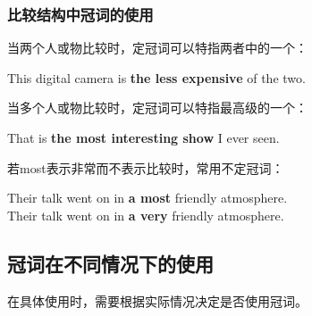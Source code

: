 \documentclass[UTF8]{ctexart}
\newcommand{\littf}[1]{{\hspace{3pt}\ttfamily #1}}
\begin{document}
\subsubsection{比较结构中冠词的使用}
    当两个人或物比较时，定冠词可以特指两者中的一个：
    \begin{center}
        \large\ttfamily
        This digital camera is \textbf{the less expensive} of the two.\\[4mm]
    \end{center}
    当多个人或物比较时，定冠词可以特指最高级的一个：
    \begin{center}
        \large\ttfamily
        That is \textbf{the most interesting show} I ever seen.\\[4mm]
    \end{center}
    若\littf{most}表示非常而不表示比较时，常用不定冠词：
    \begin{center}
        \large\ttfamily
        Their talk went on in \textbf{a most} friendly atmosphere.\\[2mm]
        Their talk went on in \textbf{a very} friendly atmosphere.
    \end{center}

\newpage
    
\subsection{冠词在不同情况下的使用}
    在具体使用时，需要根据实际情况决定是否使用冠词。
\end{document}
